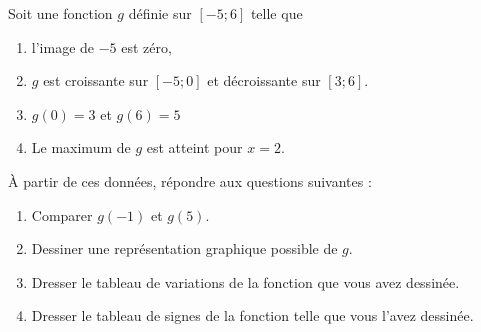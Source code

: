 
\begin{exercice}\label{exosmath-0631}

    Soit une fonction \( g\) définie sur \( [-5;6]\) telle que
    \begin{enumerate}
        \item
            l'image de \( -5\) est zéro,
        \item
            \( g\) est croissante sur \( [-5;0]\) et décroissante sur \( [3;6]\).
        \item
            \( g(0)=3\) et \( g(6)=5\)
        \item
            Le maximum de \( g\) est atteint pour \( x=2\).
    \end{enumerate}
    À partir de ces données, répondre aux questions suivantes :
    \begin{enumerate}
        \item
            Comparer \( g(-1)\) et \( g(5)\).
        \item
            Dessiner une représentation graphique possible de \( g\).
        \item
            Dresser le tableau de variations de la fonction que vous avez dessinée.
        \item
            Dresser le tableau de signes de la fonction telle que vous l'avez dessinée.
    \end{enumerate}

\end{exercice}

